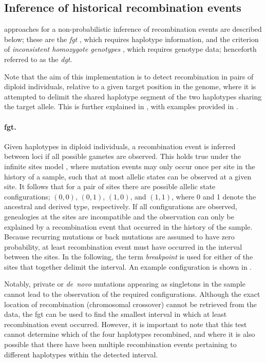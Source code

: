 %
\subsection{Inference of historical recombination events}
%

 approaches for a non-probabilistic inference of recombination events are described below; these are the \emph{\acrlong{fgt}} \citep{Hudson:1985wh}, which requires haplotype information, and the criterion of \emph{inconsistent homozygote genotypes} \citep[see][]{Mathieson:2014ig}, which requires genotype data; henceforth referred to as the \emph{\acrlong{dgt}}.

Note that the aim of this implementation is to detect recombination in pairs of diploid individuals, relative to a given target position in the genome, where it is attempted to delimit the shared haplotype segment of the two haplotypes sharing the target allele.
This is further explained in , with examples provided in .


\paragraph{\Gls{fgt}.}
Given  haplotypes in  diploid individuals, a recombination event is inferred between  loci if all  possible gametes are observed.
This holds true under the infinite sites model \citep{Kimura:1969tn}, where mutation events may only occur once per site in the history of a sample, such that at most  allelic states can be observed at a given site.
It follows that for a pair of sites there are  possible allelic state configurations; ${(0,0)}$, ${(0,1)}$, ${(1,0)}$, and ${(1,1)}$, where 0 and 1 denote the ancestral and derived type, respectively.
If all  configurations are observed, genealogies at the  sites are incompatible and the observation can only be explained by a recombination event that occurred in the history of the sample.
Because recurring mutations or back mutations are assumed to have zero probability, at least  recombination event must have occurred in the interval between the  sites.
In the following, the term \emph{breakpoint} is used for either of the  sites that together delimit the interval.
An example configuration is shown in .

%

%

Notably, private or \emph{de~novo} mutations appearing as singletons in the sample cannot lead to the observation of the  required configurations.
Although the exact location of recombination (\ie chromosomal crossover) cannot be retrieved from the data, the \gls{fgt} can be used to find the smallest interval in which at least  recombination event occurred.
However, it is important to note that this test cannot determine which of the four haplotypes recombined, and where it is also possible that there have been multiple recombination events pertaining to different haplotypes within the detected interval.


